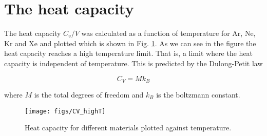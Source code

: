 \section{The heat capacity}

The heat capacity $C_v/V$ was calculated as a function of temperature for Ar, Ne, Kr and Xe and plotted which is shown in Fig. \ref{fig:heat}. As we can see in the figure the heat capacity reaches a high temperature limit. That is, a limit where the heat capacity is independent of temperature. This is predicted by the Dulong-Petit law

\begin{equation*}
  C_V = M k_B
\end{equation*}

where $M$ is the total degrees of freedom and $k_B$ is the boltzmann constant.

\begin{figure}[H]
  \centering
  \texttt{[image: figs/CV\_highT]}
  \caption{Heat capacity for different materials plotted against temperature.}
  \label{fig:heat}
\end{figure}
